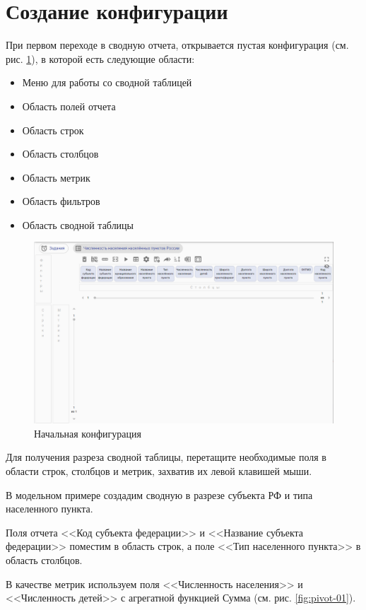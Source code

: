 \documentclass[../user-manual.tex]{subfiles}
\begin{document}
	\section{Создание конфигурации}
	При первом переходе в сводную отчета, открывается пустая конфигурация (см. рис. \ref{fig:empty-pivot}), в которой есть следующие области:

	\begin{itemize}
		
		\item Меню для работы со сводной таблицей
		
		\item Область полей отчета
		
		\item Область строк
		
		\item Область столбцов
		
		\item Область метрик
		
		\item Область фильтров
		
		\item Область сводной таблицы
	\end{itemize}
				
	\begin{figure}[h]
		\centering
		\includegraphics[width=\graphicswidth]{img/2-empty-pivot.png}
		\caption{Начальная конфигурация}
		\label{fig:empty-pivot}
	\end{figure}	

	Для получения разреза сводной таблицы, перетащите необходимые поля в области строк, столбцов и метрик, захватив их левой клавишей мыши.
	
	\begin{modelExample}
		В модельном примере создадим сводную в разрезе субъекта РФ и типа населенного пункта.		
		
		Поля отчета <<Код субъекта федерации>> и <<Название субъекта федерации>> поместим в область строк, а поле <<Тип населенного пункта>> в область столбцов.		
		
		В качестве метрик используем поля <<Численность населения>> и <<Численность детей>> с агрегатной функцией Сумма (см. рис. \ref{fig:pivot-01}).
	\end{modelExample}
\end{document}
